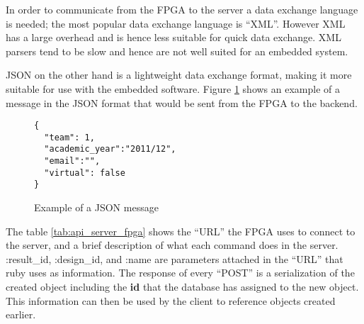 In order to communicate from the FPGA to the server a data exchange language is needed;
the most popular data exchange language is ``XML''. However XML has a large overhead and is
hence less suitable for quick data exchange. XML parsers tend to be slow and hence
are not well suited for an embedded system.

JSON on the other hand is a lightweight data exchange format, making it more suitable
for use with the embedded software. Figure \ref{fig:Json_message} shows an example of a message
in the JSON format that would be sent from the FPGA to the backend.

\begin{figure}[htb]
\centering
\lstset{basicstyle=\scriptsize\ttfamily}
\begin{lstlisting}
{
  "team": 1,
  "academic_year":"2011/12",
  "email":"",
  "virtual": false
}
\end{lstlisting}
\caption{Example of a JSON message}
\label{fig:Json_message}
\end{figure}

The table \ref{tab:api_server_fpga} shows the ``URL'' the FPGA uses to connect to the server, and
a brief description of what each command does in the server. :result\_id, :design\_id,
and :name are parameters attached in the ``URL'' that ruby uses as information. The response
of every ``POST'' is a serialization of the created object including the \textbf{id} that
the database has assigned to the new object. This information can then be used by the
client to reference objects created earlier.

